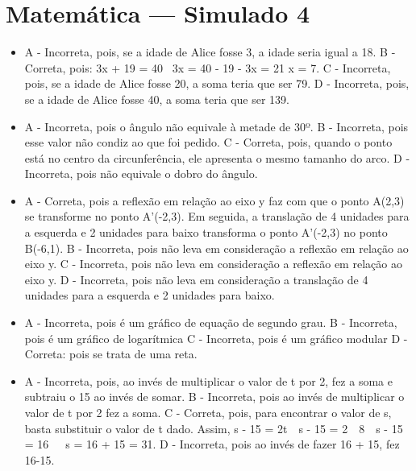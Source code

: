 \section*{Matemática — Simulado 4}
\begin{itemize}
\item A - Incorreta, pois, se a idade de Alice fosse 3, a idade seria igual a
18.
B - Correta, pois:
3x + 19 = 40 \Rightarrow \ 3x = 40 - 19 - \Rightarrow 3x = 21 \Rightarrow x = 7.
C - Incorreta, pois, se a idade de Alice fosse 20, a soma teria que ser
79.
D - Incorreta, pois, se a idade de Alice fosse 40, a soma teria que ser
139.
\item A - Incorreta, pois o ângulo não equivale à metade de 30º.
B - Incorreta, pois esse valor não condiz ao que foi pedido.
C - Correta, pois, quando o ponto está no centro da circunferência, ele
apresenta o mesmo tamanho do arco.
D - Incorreta, pois não equivale o dobro do ângulo.
\item A - Correta, pois a reflexão em relação ao eixo y faz com que o ponto
A(2,3) se transforme no ponto A'(-2,3). Em seguida, a translação de 4
unidades para a esquerda e 2 unidades para baixo transforma o ponto
A'(-2,3) no ponto B(-6,1).
B - Incorreta, pois não leva em consideração a reflexão em relação ao
eixo y.
C - Incorreta, pois não leva em consideração a reflexão em relação ao
eixo y.
D - Incorreta, pois não leva em consideração a translação de 4 unidades
para a esquerda e 2 unidades para baixo.
\item A - Incorreta, pois é um gráfico de equação de segundo grau.
B - Incorreta, pois é um gráfico de logarítmica
C - Incorreta, pois é um gráfico modular
D - Correta: pois se trata de uma reta.
\item A - Incorreta, pois, ao invés de multiplicar o valor de t por 2, fez a
soma e subtraiu o 15 ao invés de somar.
B - Incorreta, pois ao invés de multiplicar o valor de t por 2 fez a
soma.
C - Correta, pois, para encontrar o valor de s, basta substituir o valor
de t dado. Assim, s - 15 = 2t\  \rightarrow \ s - 15 = 2\  \times \ 8\  \rightarrow \ s - 15 = 16\  \rightarrow \ \ s = 16 + 15 = 31.
D - Incorreta, pois ao invés de fazer 16 + 15, fez 16-15.
\end{itemize}

